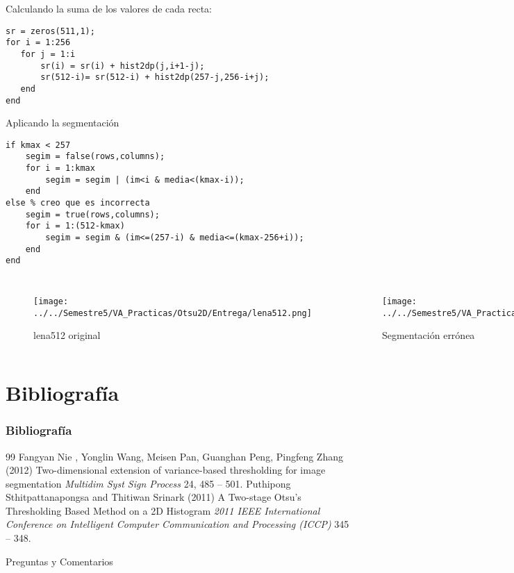 \documentclass{beamer}
\begin{document}
\begin{frame}[fragile]
Calculando la suma de los valores de cada recta:
\begin{lstlisting}
sr = zeros(511,1);
for i = 1:256
   for j = 1:i
       sr(i) = sr(i) + hist2dp(j,i+1-j);
       sr(512-i)= sr(512-i) + hist2dp(257-j,256-i+j);
   end
end  
\end{lstlisting}

\end{frame}

\begin{frame}[fragile]
Aplicando la segmentación
\begin{lstlisting}
if kmax < 257
    segim = false(rows,columns);
    for i = 1:kmax
        segim = segim | (im<i & media<(kmax-i));
    end
else % creo que es incorrecta
    segim = true(rows,columns);
    for i = 1:(512-kmax)
        segim = segim & (im<=(257-i) & media<=(kmax-256+i));
    end
end
\end{lstlisting}

\end{frame}

\begin{frame}
\begin{columns}[t]
\begin{figure}
\texttt{[image: ../../Semestre5/VA\_Practicas/Otsu2D/Entrega/lena512.png]}
\caption{lena512 original}
\end{figure}

\begin{figure}
\texttt{[image: ../../Semestre5/VA\_Practicas/Otsu2D/Entrega/seg\_lena512.png]}
\caption{Segmentación errónea}
\end{figure}

\end{columns}
\end{frame}

\section{Bibliografía}
\begin{frame}
\frametitle{Bibliografía}
\footnotesize{
\begin{thebibliography}{99} %
 Fangyan Nie , Yonglin Wang, Meisen Pan, Guanghan Peng, Pingfeng Zhang (2012)
\newblock Two-dimensional extension of variance-based thresholding for image segmentation
\newblock \emph{Multidim Syst Sign Process} 24, 485 -- 501.
 Puthipong Sthitpattanapongsa and Thitiwan Srinark (2011)
\newblock A Two-stage Otsu’s Thresholding Based Method on a 2D Histogram
\newblock \emph{2011 IEEE International Conference on Intelligent Computer Communication and Processing (ICCP)}  345 -- 348.
\end{thebibliography}
}
\end{frame}


\begin{frame}
\Huge{\centerline{Preguntas y Comentarios}}
\end{frame}

\end{document}
